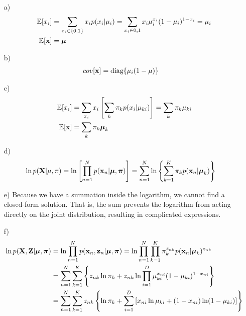 \documentclass{amsmlaj}
\begin{document}
\begin{problem}
\begin{sol}
	\begin{itemize}
		\item[a)] \hfill \vspace{-1cm}
			\begin{align}
				\mathbb{E}[x_i]&=\sum_{x_i \in \{0,1\}}x_ip(x_i|\mu_i)
				=\sum_{x_i \in {0,1}}x_i\mu_i^{x_i}(1-\mu_i)^{1-x_i}
				=\mu_i \\
				\mathbb{E}[\bm{\mathbf{x}}]&=\bm{\mathbf{\mu}}
			\end{align}
		\item[b)] \hfill \vspace{-1cm}
			\begin{align}
				cov[\bm{\mathbf{x}}]&=\text{diag}\{\mu_i(1-\mu)\}
			\end{align}
		\item[c)] \hfill \vspace{-1cm}
			\begin{align}
				\mathbb{E}[x_i]&=\sum_{x_i}x_i\left[\sum_k\pi_kp(x_i|\mu_{ki})\right]
				=\sum_k \pi_k\mu_{ki} \\
				\mathbb{E}[\bm{\mathbf{x}}]&=\sum_k \pi_k \bm{\mathbf{\mu}}_k
			\end{align}
		\item[d)] \hfill \vspace{-1cm}
			\begin{align}
				\ln p(\bm{\mathbf{X}}|\mu,\pi)&=\ln\left[\prod_{n=1}^Np(\bm{\mathbf{x}}_n|\bm{\mathbf{\mu}},\bm{\mathbf{\pi}})\right]
				=\sum_{n=1}^N \ln \left\{ \sum_{k=1}^K \pi_k p(\bm{\mathbf{x}}_n|\bm{\mathbf{\mu}}_k) \right\}
			\end{align}
		\item[e)] Because we have a summation inside the logarithm, we cannot find a
			closed-form solution. That is, the sum prevents the logarithm from
			acting directly on the joint distribution, resulting in complicated expressions.
		\item[f)] \hfill \vspace{-1cm}
			\begin{align}
				\ln p(\vt{X},\vt{Z}|\vt{\mu},\vt{\pi})
				&=\ln \prod_{n=1}^N p(\vt{x}_n,\vt{z}_n|\vt{\mu},\vt{\pi})
				=\ln \prod_{n=1}^N \prod_{k=1}^K\pi_k^{z_{nk}}p(\vt{x}_n|\vt{\mu}_k)^{z_{nk}} \\
				&=\sum_{n=1}^N\sum_{k=1}^K \left\{
					z_{nk}\ln\pi_k
					+z_{nk}\ln \prod_{i=1}^D \mu_{ki}^{x_{ni}}(1-\mu_{ki})^{1-x_{ni}}
				\right\} \\
				&=\sum_{n=1}^N\sum_{k=1}^K z_{nk} \left\{
					\ln \pi_k
					+\sum_{i=1}^D \left[
						x_{ni}\ln\mu_{ki}+(1-x_{ni})\ln(1-\mu_{ki})
					\right]
				\right\}

\end{align}
\end{itemize}
\end{sol}
\end{problem}
\end{document}
